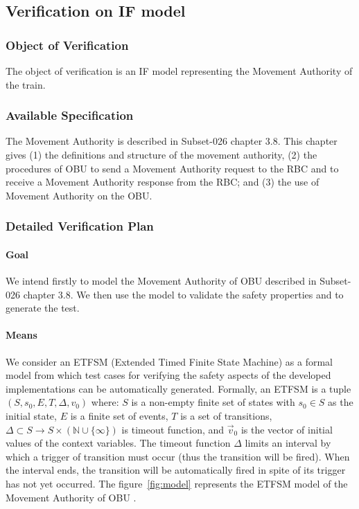 \subsection{Verification on IF model}
\subsubsection{Object of Verification}
The object of verification is an IF model representing the Movement Authority of
the train.

\subsubsection{Available Specification}
The Movement Authority is described in Subset-026 chapter 3.8. This chapter
gives (1) the definitions and structure of the movement authority, 
(2) the procedures of OBU to send a Movement Authority request to
the RBC and to receive a Movement Authority response from the RBC;
and (3) the use of Movement Authority on the OBU.


\subsubsection{Detailed Verification Plan}

\paragraph{Goal} 
We intend firstly to model the Movement Authority of OBU described in
Subset-026 chapter 3.8. We then use the model to validate the safety
properties and to generate the test.


\paragraph{Means}

We consider an ETFSM (Extended Timed Finite State Machine) as a formal model
from which test cases for verifying the safety aspects of the developed
implementations can be automatically generated.
Formally, 
    an ETFSM is a tuple 
    $(S, s_0, E, T,  \Delta, v_0)$ where:
    $S$ is a non-empty finite set of states with $s_0 \in S$ as the
        initial state,
 $E$ is a finite set of events,
 $T$ is a set of transitions, 
 $\Delta \subset S \to S \times (\mathbb{N} \cup \{ \infty \})$ is timeout function, and
 $\vec{v}_0$ is the vector of initial values of the context variables.
The timeout function $\Delta$ limits an interval by which a trigger of
transition must occur (thus the transition will be fired). 
When the interval ends, the transition will be automatically fired in spite of
its trigger has not yet occurred.
The figure~\ref{fig:model} represents the ETFSM model of the Movement Authority of OBU .

